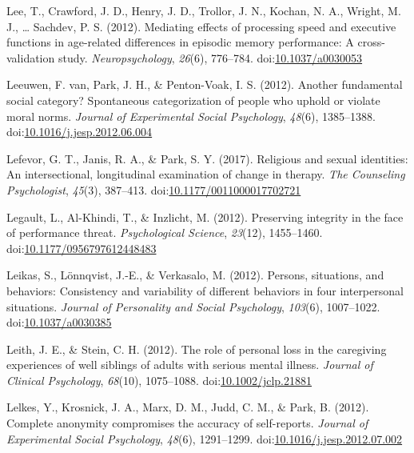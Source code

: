 \documentclass[english,man]{apa6}
\begin{document}
\hypertarget{ref-Lee2012a}{}
Lee, T., Crawford, J. D., Henry, J. D., Trollor, J. N., Kochan, N. A.,
Wright, M. J., \ldots{} Sachdev, P. S. (2012). Mediating effects of
processing speed and executive functions in age-related differences in
episodic memory performance: A cross-validation study.
\emph{Neuropsychology}, \emph{26}(6), 776--784.
doi:\href{https://doi.org/10.1037/a0030053}{10.1037/a0030053}

\hypertarget{ref-VanLeeuwen2012}{}
Leeuwen, F. van, Park, J. H., \& Penton-Voak, I. S. (2012). Another
fundamental social category? Spontaneous categorization of people who
uphold or violate moral norms. \emph{Journal of Experimental Social
Psychology}, \emph{48}(6), 1385--1388.
doi:\href{https://doi.org/10.1016/j.jesp.2012.06.004}{10.1016/j.jesp.2012.06.004}

\hypertarget{ref-Lefevor2017}{}
Lefevor, G. T., Janis, R. A., \& Park, S. Y. (2017). Religious and
sexual identities: An intersectional, longitudinal examination of change
in therapy. \emph{The Counseling Psychologist}, \emph{45}(3), 387--413.
doi:\href{https://doi.org/10.1177/0011000017702721}{10.1177/0011000017702721}

\hypertarget{ref-Legault2012}{}
Legault, L., Al-Khindi, T., \& Inzlicht, M. (2012). Preserving integrity
in the face of performance threat. \emph{Psychological Science},
\emph{23}(12), 1455--1460.
doi:\href{https://doi.org/10.1177/0956797612448483}{10.1177/0956797612448483}

\hypertarget{ref-Leikas2012}{}
Leikas, S., Lönnqvist, J.-E., \& Verkasalo, M. (2012). Persons,
situations, and behaviors: Consistency and variability of different
behaviors in four interpersonal situations. \emph{Journal of Personality
and Social Psychology}, \emph{103}(6), 1007--1022.
doi:\href{https://doi.org/10.1037/a0030385}{10.1037/a0030385}

\hypertarget{ref-Leith2012}{}
Leith, J. E., \& Stein, C. H. (2012). The role of personal loss in the
caregiving experiences of well siblings of adults with serious mental
illness. \emph{Journal of Clinical Psychology}, \emph{68}(10),
1075--1088.
doi:\href{https://doi.org/10.1002/jclp.21881}{10.1002/jclp.21881}

\hypertarget{ref-Lelkes2012}{}
Lelkes, Y., Krosnick, J. A., Marx, D. M., Judd, C. M., \& Park, B.
(2012). Complete anonymity compromises the accuracy of self-reports.
\emph{Journal of Experimental Social Psychology}, \emph{48}(6),
1291--1299.
doi:\href{https://doi.org/10.1016/j.jesp.2012.07.002}{10.1016/j.jesp.2012.07.002}
\end{document}
